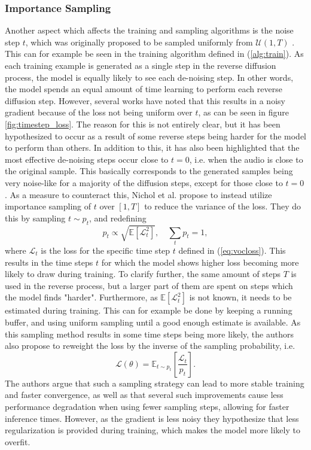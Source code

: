 \documentclass{report}
\begin{document}
\subsubsection{Importance Sampling}
Another aspect which affects the training and sampling algorithms is the noise step $t$, which was originally proposed to be sampled uniformly from $\mathcal{U}(1, T)$ \cite{ho2020denoising}. This can for example be seen in the training algorithm defined in (\ref{alg:train}). As each training example is generated as a single step in the reverse diffusion process, the model is equally likely to see each de-noising step. In other words, the model spends an equal amount of time learning to perform each reverse diffusion step. However, several works have noted that this results in a noisy gradient because of the loss not being uniform over $t$, as can be seen in figure \ref{fig:timestep_loss}. The reason for this is not entirely clear, but it has been hypothesized to occur as a result of some reverse steps being harder for the model to perform than others. In addition to this, it has also been highlighted that the most effective de-noising steps occur close to $t=0$, i.e. when the audio is close to the original sample. This basically corresponds to the generated samples being very noise-like for a majority of the diffusion steps, except for those close to $t=0$ \cite{kong2020diffwave, nichol2021improved}. As a measure to counteract this, Nichol et al. propose to instead utilize importance sampling of $t$ over $[1, T]$ to reduce the variance of the loss. They do this by sampling $t\sim p_t$, and redefining
\begin{equation} \label{eq:weighted}
    p_t \propto \sqrt{\mathbb{E}\left[ \mathcal{L}_{t}^2 \right] }, \quad \sum_t p_t = 1, 
\end{equation}
where $\mathcal{L}_{t}$ is the loss for the specific time step $t$ defined in (\ref{eq:vocloss}). This results in the time steps $t$ for which the model shows higher loss becoming more likely to draw during training. To clarify further, the same amount of steps $T$ is used in the reverse process, but a larger part of them are spent on steps which the model finds "harder". Furthermore, as $\mathbb{E}[\mathcal{L}_t^2]$ is not known, it needs to be estimated during training. This can for example be done by keeping a running buffer, and using uniform sampling until a good enough estimate is available. As this sampling method results in some time steps being more likely, the authors also propose to reweight the loss by the inverse of the sampling probability, i.e. 
\begin{equation}
    \mathcal{L}(\theta) = \mathbb{E}_{t \sim p_t} \left[ \frac{\mathcal{L}_{t}}{p_t} \right].
\end{equation}
The authors argue that such a sampling strategy can lead to more stable training and faster convergence, as well as that several such improvements cause less performance degradation when using fewer sampling steps, allowing for faster inference times. However, as the gradient is less noisy they hypothesize that less regularization is provided during training, which makes the model more likely to overfit.
\end{document}
